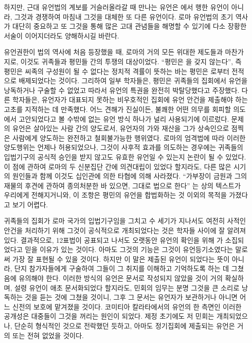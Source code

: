 하지만,
근대 유언법의 계보를 거슬러올라갈 때 만나는 유언은
에서 행한 유언이 아니라,
그것과 경쟁하여 마침내 그것을 대체한 또 다른 유언이다.
로마 유언법의 초기 역사가 대단히 중요하고
또 그것을 통해 많은 고대 관념들을 해명할 수 있기에
다소 장황한 서술이 이어지더라도 양해하시길 바란다.

유언권한이 법의 역사에 처음 등장했을 때,
로마의 거의 모든 위대한 제도들과 마찬가지로,
이것도 귀족들과 평민들 간의 투쟁의 대상이었다.
``평민은 을 갖지 않는다'',
즉 평민은 씨족의 구성원이 될 수 없다는 정치적 격률이 뜻하는 바는
평민은 로부터 전적으로 배제되었다는 것이다. %
그리하여 일부 학자들은, 평민은 귀족들의 집회에서 유언을
낭독하거나 구술할 수 없었고
따라서 유언의 특권을 완전히 박탈당했다고 주장했다.
다른 학자들은, 유언자가 대표되지 못하는 비우호적인 집회에
유언 안건을 제출해야 하는 고초를 지적하는 데 만족했다.
어느 견해가 진실이든,
불쾌한 어떤 의무를 회피할 의도에서 고안되었다고 볼 수밖에 없는
유언 방식 하나가 널리 사용되기에 이르렀다.
문제의 유언은 살아있는 사람 간의 양도로서,
유언자의 가와 재산을 그가 상속인으로 점찍은 사람에게 양도하는
완전하고 철회불가능한 행위였다.
로마의 엄격법에 따라 이러한 양도행위는 언제나 허용되었으나,
그것이 사후적 효과를 의도하는 경우에는
귀족들의 입법기구의 공식적 승인을 받지 않고도 유효한 유언일 수 있는지
논란이 될 수 있었다.
이 점에 관하여 로마의 두 신분집단 간에 의견대립이 있었다 할지라도,
다른 많은 시기의 원인들과 함께
이것도 십인관에 의한
타협에 의해 사라졌다.
``가부장이 금원과 그의 재물의 후견에 관하여 종의처분한 바
있으면, 그대로 법으로 한다''%
는
상의 텍스트가 우리에게 전해지거니와,
이 조항은
평민의 유언을 합법화하는 것 이외의 목적을 가졌다고 보기 어렵다.

귀족들의 집회가 로마 국가의 입법기구임을 그치고 수 세기가 지나서도
여전히 사적인 안건을 처리하기 위해 그것이 공식적으로 개최되었다는 것은
학자들 사이에 잘 알려져 있다.
결과적으로, 12표법이 공표되고 나서도 오랫동안
유언의 확인을 위해 가 소집되었다고 믿을 이유가 있는 것이다.
아마도 그것의 기능은
그것이 유언등기소였다는
말로써 가장 잘 표현될 수 있을 것이다.
하지만 이 말은 제출된 유언이 되었다는
뜻이 아니라,
단지 참가자들에게 구술하여 그들이 그 취지를 이해하고 기억하도록 하는 데
그쳤음에 유의해야 한다.
이러한 방식의 유언은 문서로 작성되지 않았을 것이 거의 확실하며,
설령 유언이 애초 문서화되었다 할지라도, 민회의 임무는 분명
그것을 큰 소리로 낭독하는 것을 듣는 것에 그쳤을 것이니,
그후 그 문서는 유언자가 보관하거나 아니면
어느 신전의 보호에 맡겨졌을 것이다.
코미티아 칼라타에서의 유언의 한 측면인
이러한 공개성은 대중들이 그것을 꺼리는 원인이 되었다.
제정 초기에도 저 민회는 개최되었으나,
단순히 형식적인 것으로 전락했던 듯하고, 아마도
정기집회에 제출되는 유언은 거의 또는 전혀 없었을 것이다.

